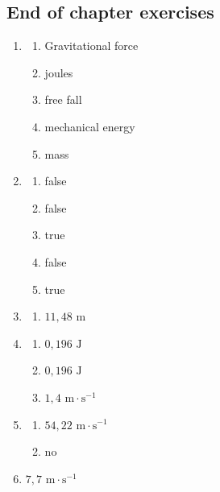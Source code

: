 \subsection{End of chapter exercises}
\begin{multicols}{3}
 \begin{enumerate}[noitemsep, label=\textbf{(\arabic*)} ]
  \item 
\begin{enumerate}[noitemsep, label=\textbf{(\alph*)} ]
 \item Gravitational force
\item joules
\item free fall
\item mechanical energy
\item mass
\end{enumerate}
\item 
\begin{enumerate}[noitemsep, label=\textbf{(\alph*)} ]
 \item false
\item false
\item true
\item false
\item true
\end{enumerate}
\item 
\begin{enumerate}[noitemsep, label=\textbf{(\alph*)} ]
 \item $11,48 \text{ m}$
\end{enumerate}
\item 
\begin{enumerate}[noitemsep, label=\textbf{(\alph*)} ]
 \item $0,196 \text{ J}$
\item $0,196 \text{ J}$
\item $1,4 \text{ m}\cdot \text{s}^{-1}$
\end{enumerate}
\item 
\begin{enumerate}[noitemsep, label=\textbf{(\alph*)} ]
 \item $54,22 \text{ m}\cdot \text{s}^{-1}$
\item no
\end{enumerate}
\item $7,7 \text{ m}\cdot \text{s}^{-1}$
 \end{enumerate}
\end{multicols}
